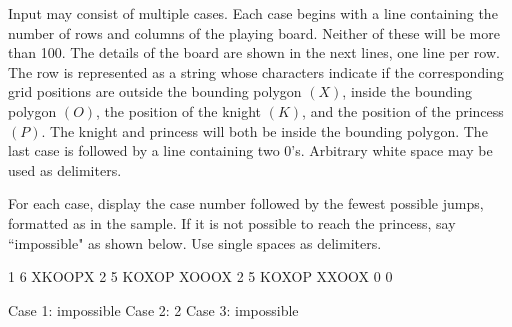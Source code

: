\documentclass{article}
\begin{document}
\begin{inputDescription}
Input may consist of multiple cases.  Each case begins with a line containing
the number of rows and columns of the playing board.  Neither of these will 
be more than 100.  The details of the board are 
shown in the next lines, one line per row.  The row is represented as a string
whose characters indicate if the corresponding grid positions are outside the
bounding polygon $(X)$, inside the bounding polygon $(O)$, the position of the
knight $(K)$, and the position of the princess $(P)$.  The knight and princess will
both be inside the bounding polygon.  The last case is followed by a line 
containing two 0's.  Arbitrary white space may be used as delimiters.
\end{inputDescription}

\begin{outputDescription}
For each case, display the case number followed by the fewest possible jumps,
formatted as in the sample.  If it is not possible to reach the princess, say
``impossible" as shown below.  Use single spaces as delimiters.
\end{outputDescription}

\begin{sampleInput}
1    6
  XKOOPX
2 5
KOXOP
XOOOX
2 5
KOXOP
XXOOX
0 0
\end{sampleInput}
\begin{sampleOutput}
Case 1: impossible
Case 2: 2
Case 3: impossible
\end{sampleOutput}
\end{document}
